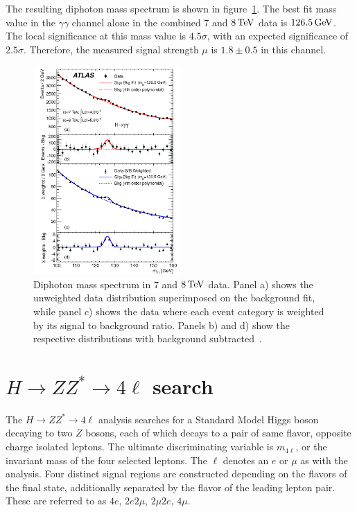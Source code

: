 The resulting diphoton mass spectrum is shown in figure~\ref{fig:disc_mgg}. The best fit mass value in the $\gamma\gamma$ channel alone in the combined $7$ and $8 \TeV$ data is $126.5 \GeV$. The local significance at this mass value is $4.5\sigma$, with an expected significance of $2.5\sigma$. Therefore, the measured signal strength $\mu$ is $1.8 \pm 0.5$ in this channel. 

\begin{figure}[h!]
  \centering
  \captionsetup{justification=centering}
  \includegraphics[width=0.5\textwidth]{figures/discovery_mgg}
  \caption{Diphoton mass spectrum in $7$ and $8 \TeV$ data. Panel a) shows the unweighted data distribution superimposed on the background fit, while panel c) shows the data where each event category is weighted by its signal to background ratio. Panels b) and d) show the respective distributions with background subtracted~\cite{Discovery}.}
  \label{fig:disc_mgg}
\end{figure}

\section{$H\to ZZ^* \to 4\ell$ search}

The $H\to ZZ^* \to 4\ell$ analysis searches for a Standard Model Higgs boson decaying to two $Z$ bosons, each of which decays to a pair of same flavor, opposite charge isolated leptons. The ultimate discriminating variable is $m_{4\ell}$, or the invariant mass of the four selected leptons. The $\ell$ denotes an $e$ or $\mu$ as with the \HWWfull analysis. Four distinct signal regions are constructed depending on the flavors of the final state, additionally separated by the flavor of the leading lepton pair. These are referred to as $4e$, $2e2\mu$, $2\mu2e$, $4\mu$. 

